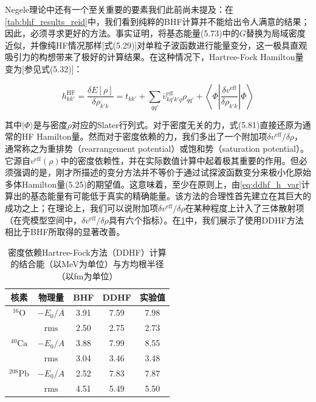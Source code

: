 Negele理论中还有一个至关重要的要素我们此前尚未提及：在\ref{tab:bhf_results_reid}中，我们看到纯粹的BHF计算并不能给出令人满意的结果；因此，必须寻求更好的方法。事实证明，将基态能量(5.73)中的$G$替换为局域密度近似，并像纯HF情况那样{[}式(5.29){]}对单粒子波函数进行能量变分，这一极具直观吸引力的构想带来了极好的计算结果。在这种情况下，Hartree-Fock
Hamilton量变为{[}参见式(5.32){]}：

\begin{equation}
h^{\mathrm{HF}}_{kk'}=\frac{\delta E[\rho]}{\delta\rho_{k'k}}=t_{kk'}+\sum_{qq'}\bar{v}^{\mathrm{eff}}_{kq'k'q}\rho_{qq'}+\left\langle \Phi\left|\frac{\delta v^{\mathrm{eff}}}{\delta\rho_{k'k}}\right|\Phi\right\rangle \label{eq:ddhf_h_var}
\end{equation}

其中$|\Phi\rangle$是与密度$\rho$对应的Slater行列式。对于密度无关的力，式(5.81)直接还原为通常的HF
Hamilton量。然而对于密度依赖的力，我们多出了一个附加项$\delta v^{\mathrm{eff}}/\delta\rho$，通常称之为重排势（rearrangement
potential）或饱和势（saturation potential）。它源自$v^{\mathrm{eff}}(\rho)$中的密度依赖性，并在实际数值计算中起着极其重要的作用。但必须强调的是，刚才所描述的变分方法并不等价于通过试探波函数变分来极小化原始多体Hamilton量(5.25)的期望值。这意味着，至少在原则上，由\ref{eq:ddhf_h_var}计算出的基态能量有可能低于真实的精确能量。该方法的合理性首先建立在其巨大的成功之上；在理论上，我们可以说附加项$\delta v^{\mathrm{eff}}/\delta\rho$在某种程度上计入了三体散射项\cite{Ne75}（在壳模型空间中，$\delta v^{\mathrm{eff}}/\delta\rho$具有六个指标）。在\ref{tab:ddhf_results}中，我们展示了使用DDHF方法相比于BHF所取得的显著改善\cite{Ne70,NV75}。

\begin{table}[H]
\begin{centering}
\caption{\label{tab:ddhf_results}密度依赖Hartree-Fock方法（DDHF）计算的结合能（以MeV为单位）与方均根半径（以fm为单位）}
\par\end{centering}
\centering{}%
\begin{tabular}{|c|c|c|c|c|}
\hline 
核素 & 物理量 & BHF & DDHF & 实验值\tabularnewline
\hline 
\hline 
$^{16}\mathrm{O}$ & $-E_{0}/A$ & 3.91 & 7.59 & 7.98\tabularnewline
 & $\mathrm{rms}$ & 2.50 & 2.75 & 2.73\tabularnewline
\hline 
$^{40}\mathrm{Ca}$ & $-E_{0}/A$ & 3.88 & 7.99 & 8.55\tabularnewline
 & $\mathrm{rms}$ & 3.04 & 3.46 & 3.48\tabularnewline
\hline 
$^{208}\mathrm{Pb}$ & $-E_{0}/A$ & 2.52 & 7.83 & 7.87\tabularnewline
 & $\mathrm{rms}$ & 4.51 & 5.49 & 5.50\tabularnewline
\hline 
\end{tabular}
\end{table}

